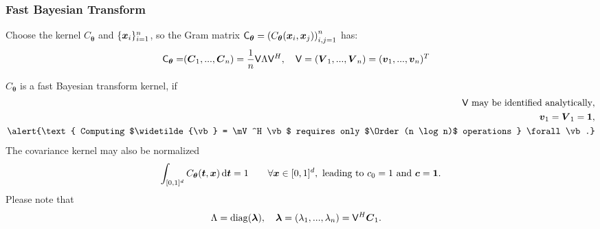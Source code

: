 \documentclass[handout, 10pt,compress,xcolor={usenames,dvipsnames}]{beamer} %
\newcommand{\bm}[1]{\boldsymbol{#1}}
\renewcommand{\mLambda}{\Lambda}
\newcommand{\vC}{\bvec{C}}
\newcommand{\mCtheta}{\mC_{\vtheta}}
\newcommand{\D}[1]{\text{d}{#1}}
\renewcommand{\vtheta}{{\bm{\theta}}}
\newcommand{\pause}{}
\begin{document}
\begin{frame}
\frametitle{Fast Bayesian Transform}
\vspace{-4ex}
Choose the kernel $C_{\vtheta}$ and $\{\boldsymbol{x}_i\}_{i=1}^n$, so the Gram matrix $\mCtheta =  \left( C_{\vtheta} (\vx_i,\vx_j) \right)_{i,j=1}^n$ has:
\vspace{-2ex}
\begin{align*}
\mCtheta =& (\vC_1,...,\vC_n)
=  \frac 1n \mV \mLambda \mV^H, \quad
\mV = (\vV_1,...,\vV_n) = (\vv_1,...,\vv_n)^T
\end{align*}
\pause 
\vspace{-2ex}
$C_{\vtheta}$ is a fast Bayesian transform kernel, if 
\begin{subequations} \label{fastcompAssump}
	\begin{align}
	\label{fastcompAssumpA}
	\mV \text{ may be identified analytically}, \\
	\label{fastcompAssumpB}
	\vv_1 = \vV_1 = \vone, \\
	\label{fastcompAssumpC}
	\alert{\text{ Computing $\widetilde{\vb} = \mV^H \vb$ requires only $\Order(n \log n)$ operations } \forall \vb.}
	\end{align}
\end{subequations}
\vspace{-1.5ex}
The covariance kernel may also be normalized 
\begin{align}
\label{addAssump}
\int_{[0,1]^d} C_\vtheta(\vt,\vx) \, \D \vt = 1 \qquad \forall \vx \in [0,1]^d,
\text{ leading to $c_0 = 1$ and $\vc = \vone$}.
\end{align}
Please note that
\begin{align*}
\mLambda &= \diag (\vlambda), \quad \vlambda = (\lambda_1,...,\lambda_n) = \mV^H \vC_1.
\end{align*}

\end{frame}
\end{document}
